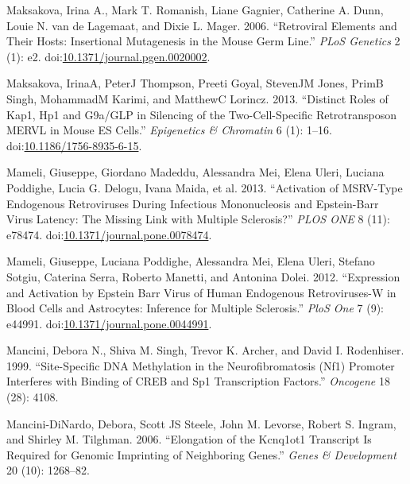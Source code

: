 \documentclass[onehalf,12pt]{beavtex}
\begin{document}
  \hypertarget{ref-MaksakovaRetroviralElementsTheir2006}{}
  Maksakova, Irina A., Mark T. Romanish, Liane Gagnier, Catherine A. Dunn,
  Louie N. van de Lagemaat, and Dixie L. Mager. 2006. ``Retroviral
  Elements and Their Hosts: Insertional Mutagenesis in the Mouse Germ
  Line.'' \emph{PLoS Genetics} 2 (1): e2.
  doi:\href{https://doi.org/10.1371/journal.pgen.0020002}{10.1371/journal.pgen.0020002}.
  
  \hypertarget{ref-MaksakovaDistinctrolesKAP12013}{}
  Maksakova, IrinaA, PeterJ Thompson, Preeti Goyal, StevenJM Jones, PrimB
  Singh, MohammadM Karimi, and MatthewC Lorincz. 2013. ``Distinct Roles of
  Kap1, Hp1 and G9a/GLP in Silencing of the Two-Cell-Specific
  Retrotransposon MERVL in Mouse ES Cells.'' \emph{Epigenetics \&
  Chromatin} 6 (1): 1--16.
  doi:\href{https://doi.org/10.1186/1756-8935-6-15}{10.1186/1756-8935-6-15}.
  
  \hypertarget{ref-MameliActivationMSRVTypeEndogenous2013a}{}
  Mameli, Giuseppe, Giordano Madeddu, Alessandra Mei, Elena Uleri, Luciana
  Poddighe, Lucia G. Delogu, Ivana Maida, et al. 2013. ``Activation of
  MSRV-Type Endogenous Retroviruses During Infectious Mononucleosis and
  Epstein-Barr Virus Latency: The Missing Link with Multiple Sclerosis?''
  \emph{PLOS ONE} 8 (11): e78474.
  doi:\href{https://doi.org/10.1371/journal.pone.0078474}{10.1371/journal.pone.0078474}.
  
  \hypertarget{ref-MameliExpressionactivationEpstein2012}{}
  Mameli, Giuseppe, Luciana Poddighe, Alessandra Mei, Elena Uleri, Stefano
  Sotgiu, Caterina Serra, Roberto Manetti, and Antonina Dolei. 2012.
  ``Expression and Activation by Epstein Barr Virus of Human Endogenous
  Retroviruses-W in Blood Cells and Astrocytes: Inference for Multiple
  Sclerosis.'' \emph{PloS One} 7 (9): e44991.
  doi:\href{https://doi.org/10.1371/journal.pone.0044991}{10.1371/journal.pone.0044991}.
  
  \hypertarget{ref-ManciniSitespecificDNAmethylation1999}{}
  Mancini, Debora N., Shiva M. Singh, Trevor K. Archer, and David I.
  Rodenhiser. 1999. ``Site-Specific DNA Methylation in the
  Neurofibromatosis (Nf1) Promoter Interferes with Binding of CREB and Sp1
  Transcription Factors.'' \emph{Oncogene} 18 (28): 4108.
  
  \hypertarget{ref-Mancini-DiNardoElongationKcnq1ot1transcript2006}{}
  Mancini-DiNardo, Debora, Scott JS Steele, John M. Levorse, Robert S.
  Ingram, and Shirley M. Tilghman. 2006. ``Elongation of the Kcnq1ot1
  Transcript Is Required for Genomic Imprinting of Neighboring Genes.''
  \emph{Genes \& Development} 20 (10): 1268--82.
  
\end{document}
